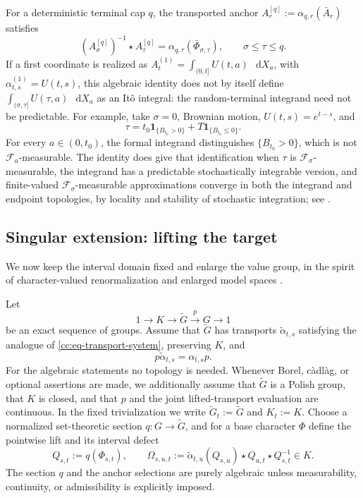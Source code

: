 \documentclass[10pt,reqno]{amsart}
\theoremstyle{plain}
\theoremstyle{definition}
\theoremstyle{remark}
\begin{document}
For a deterministic terminal cap \(q\), the transported anchor
\(A^{[q]}_r:=\alpha_{q,r}(\bar A_r)\) satisfies
\begin{equation}
 (A^{[q]}_\sigma)^{-1}\star A^{[q]}_\tau
 =\alpha_{q,\tau}(\bar\Phi_{\sigma,\tau}),
 \qquad \sigma\le\tau\le q.
 \label{cc:eq-terminal-fibre}
\end{equation}
If a first coordinate is realized as
\(A^{(1)}_t=\int_{(0,t]}U(t,a)\,{\mathop{}\!\mathrm d} X_a\), with
\(\alpha^{(1)}_{t,s}=U(t,s)\), this algebraic identity does not by itself
define \(\int_{(\sigma,\tau]}U(\tau,a)\,{\mathop{}\!\mathrm d} X_a\) as an Itô integral: the
random-terminal integrand need not be predictable.  For example, take
\(\sigma=0\), Brownian motion, \(U(t,s)=e^{t-s}\), and
\[
 \tau=t_0{\mathbf 1}_{\{B_{t_0}>0\}}+T{\mathbf 1}_{\{B_{t_0}\le0\}}.
\]
For every \(a\in(0,t_0)\), the formal integrand distinguishes
\(\{B_{t_0}>0\}\), which is not \({\mathcal F}_a\)-measurable.  The identity does
give that identification when \(\tau\) is \({\mathcal F}_\sigma\)-measurable, the
integrand has a predictable stochastically integrable version, and
finite-valued \({\mathcal F}_\sigma\)-measurable approximations converge in both the
integrand and endpoint topologies, by locality and stability of stochastic
integration; see \cite[Ch.~4]{Applebaum09}.

\subsection{Singular extension: lifting the target}

We now keep the interval domain fixed and enlarge the value group, in the
spirit of character-valued renormalization and enlarged model spaces
\cite{ConnesKreimer00,Hairer14}.

Let
\begin{equation}
 1\longrightarrow K\longrightarrow\widetilde G
 \xrightarrow{\,p\,}G\longrightarrow1
 \label{cc:eq-target-extension}
\end{equation}
be an exact sequence of groups.  Assume that \(\widetilde G\) has transports
\(\widetilde\alpha_{t,s}\) satisfying the analogue of
\eqref{cc:eq-transport-system}, preserving \(K\), and
\begin{equation}
 p\widetilde\alpha_{t,s}=\alpha_{t,s}p.
 \label{cc:eq-lifted-transport}
\end{equation}
For the algebraic statements no topology is needed.  Whenever Borel,
càdlàg, or optional assertions are made, we additionally assume that
\(\widetilde G\) is a Polish group, that \(K\) is closed, and that \(p\) and
the joint lifted-transport evaluation are continuous.
In the fixed trivialization we write
\(\widetilde G_t:=\widetilde G\) and \(K_t:=K\).
Choose a normalized set-theoretic section \(q:G\to\widetilde G\), and for
a base character \(\Phi\) define the pointwise lift and its interval defect
\begin{equation}
 Q_{s,t}:=q(\Phi_{s,t}),
 \qquad
 \Omega_{s,u,t}
 :=\widetilde\alpha_{t,u}(Q_{s,u})\star Q_{u,t}
   \star Q_{s,t}^{-1}\in K.
 \label{cc:eq-lifting-defect}
\end{equation}
The section \(q\) and the anchor selections are purely algebraic unless
measurability, continuity, or admissibility is explicitly imposed.
\end{document}

